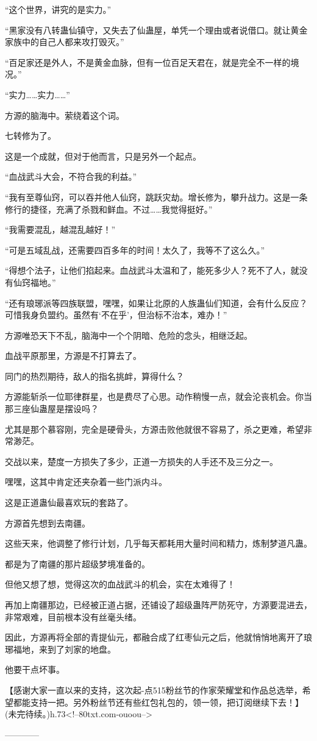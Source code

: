 \begin{this_body}
“这个世界，讲究的是实力。”

“黑家没有八转蛊仙镇守，又失去了仙蛊屋，单凭一个理由或者说借口。就让黄金家族中的自己人都来攻打毁灭。”

“百足家还是外人，不是黄金血脉，但有一位百足天君在，就是完全不一样的境况。”

“实力……实力……”

方源的脑海中。萦绕着这个词。

七转修为了。

这是一个成就，但对于他而言，只是另外一个起点。

“血战武斗大会，不符合我的利益。”

“我有至尊仙窍，可以吞并他人仙窍，跳跃灾劫。增长修为，攀升战力。这是一条修行的捷径，充满了杀戮和鲜血。不过……我觉得挺好。”

“我需要混乱，越混乱越好！”

“可是五域乱战，还需要四百多年的时间！太久了，我等不了这么久。”

“得想个法子，让他们掐起来。血战武斗太温和了，能死多少人？死不了人，就没有仙窍福地。”

“还有琅琊派等四族联盟，嘿嘿，如果让北原的人族蛊仙们知道，会有什么反应？可惜我身负盟约。虽然有‘不在乎’，但治标不治本，难办！”

方源唯恐天下不乱，脑海中一个个阴暗、危险的念头，相继泛起。

血战平原那里，方源是不打算去了。

同门的热烈期待，敌人的指名挑衅，算得什么？

方源能斩杀一位耶律群星，也是费尽了心思。动作稍慢一点，就会沦丧机会。你当那三座仙蛊屋是摆设吗？

尤其是那个慕容刚，完全是硬骨头，方源击败他就很不容易了，杀之更难，希望非常渺茫。

交战以来，楚度一方损失了多少，正道一方损失的人手还不及三分之一。

嘿嘿，这其中肯定还夹杂着一些门派内斗。

这是正道蛊仙最喜欢玩的套路了。

方源首先想到去南疆。

这些天来，他调整了修行计划，几乎每天都耗用大量时间和精力，炼制梦道凡蛊。

都是为了南疆的那片超级梦境准备的。

但他又想了想，觉得这次的血战武斗的机会，实在太难得了！

再加上南疆那边，已经被正道占据，还铺设了超级蛊阵严防死守，方源要混进去，非常艰难，目前根本没有丝毫头绪。

因此，方源再将全部的青提仙元，都融合成了红枣仙元之后，他就悄悄地离开了琅琊福地，来到了刘家的地盘。

他要干点坏事。

【感谢大家一直以来的支持，这次起-点515粉丝节的作家荣耀堂和作品总选举，希望都能支持一把。另外粉丝节还有些红包礼包的，领一领，把订阅继续下去！】(未完待续。)h.73<!--80txt.com-ouoou-->

------------

\end{this_body}

